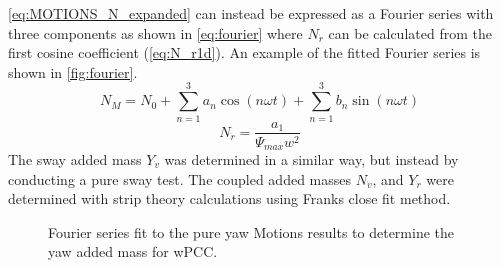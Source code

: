 \autoref{eq:MOTIONS_N_expanded} can instead be expressed as a Fourier series with three components as shown in \autoref{eq:fourier} where $N_{\dot{r}}$ can be calculated from the first cosine coefficient (\autoref{eq:N_r1d}). An example of the fitted Fourier series is shown in \autoref{fig:fourier}.
\begin{equation}
    N_M = N_0 + \sum_{n=1}^3a_n \cos(n \omega t) + \sum_{n=1}^3b_n \sin(n \omega t) 
    \label{eq:fourier}
\end{equation}
\begin{equation}
    N_{\dot{r}} = \frac{a_1}{\Psi_{max} w^{2}}
    \label{eq:N_r1d}
\end{equation}
The sway added mass $Y_{\dot{v}}$ was determined in a similar way, but instead by conducting a pure sway test. The coupled added masses $N_{\dot{v}}$, and $Y_{\dot{r}}$ were determined with strip theory calculations using Franks close fit method.
\begin{figure}[h]
    \centering
    
    \caption{Fourier series fit to the pure yaw Motions results to determine the yaw added mass for wPCC.}
    \label{fig:fourier}
\end{figure}
